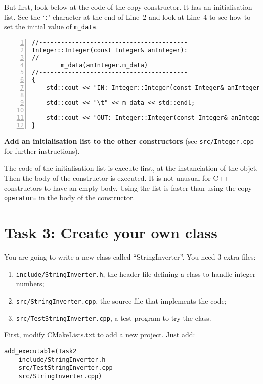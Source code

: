 But first, look below at the code of the copy constructor. 
It has an initialisation list. 
See the `\verb+:+' character at the end of Line~2 and look at Line~4 to see how to set the initial value of \verb+m_data+.
\begin{lstlisting}[numbers=left]
//-----------------------------------------
Integer::Integer(const Integer& anInteger):
//-----------------------------------------
        m_data(anInteger.m_data)
//-----------------------------------------
{
    std::cout << "IN: Integer::Integer(const Integer& anInteger)" << std::endl;

    std::cout << "\t" << m_data << std::endl;

    std::cout << "OUT: Integer::Integer(const Integer& anInteger)" << std::endl;
}
\end{lstlisting}

\large\textbf{Add an initialisation list to the other constructors}
(see \verb+src/Integer.cpp+ for further instructions).

The code of the initialisation list is execute first, at the instanciation of the objet. 
Then the body of the constructor is executed. 
It is not unusual for C++ constructors to have an empty body. 
Using the list is faster than using the copy \verb+operator=+ in the body of the constructor. 


\section*{Task 3: Create your own class}

You are going to write a new class called ``StringInverter''. 
You need 3 extra files:
\begin{enumerate}
  \item \verb+include/StringInverter.h+, the header file defining a class to handle integer numbers;
  \item \verb+src/StringInverter.cpp+, the source file that implements the code;
  \item \verb+src/TestStringInverter.cpp+, a test program to try the class.
\end{enumerate}
First, modify CMakeLists.txt to add a new project. 
Just add:
\begin{lstlisting}
add_executable(Task2 
	include/StringInverter.h 
	src/TestStringInverter.cpp 
	src/StringInverter.cpp)
\end{lstlisting}


